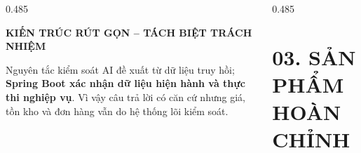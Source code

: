 \documentclass[final]{beamer}
\begin{document}
\begin{frame}[t]
\begin{columns}[t,totalwidth=\textwidth]
\begin{column}{0.485\textwidth}
\begin{center}
\vspace{0.9cm}
{\color{posterBlue}\Large\bfseries KIẾN TRÚC RÚT GỌN -- TÁCH BIỆT TRÁCH NHIỆM}

\vspace{0.55cm}
\end{center}

\vspace{0.45cm}
\begin{block}{Nguyên tắc kiểm soát}
AI đề xuất từ dữ liệu truy hồi; \textbf{Spring Boot xác nhận dữ liệu hiện hành và thực thi nghiệp vụ}. Vì vậy câu trả lời có căn cứ nhưng giá, tồn kho và đơn hàng vẫn do hệ thống lõi kiểm soát.
\end{block}

\end{column}

\begin{column}{0.485\textwidth}
\justifying

\section{03. SẢN PHẨM HOÀN CHỈNH}


\end{column}
\end{columns}
\end{frame}
\end{document}

